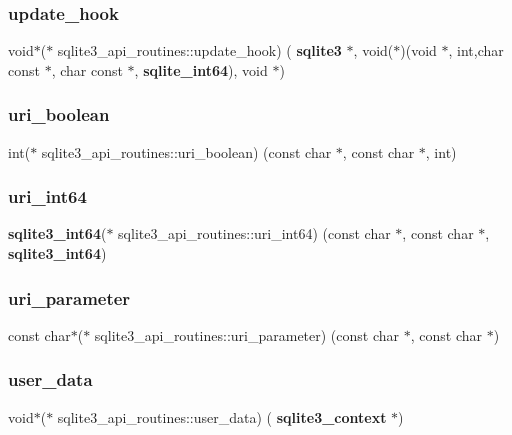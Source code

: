 \subsubsection{update\_hook}
{\footnotesize\ttfamily void$\ast$($\ast$ sqlite3\+\_\+api\+\_\+routines\+::update\+\_\+hook) (\textbf{ sqlite3} $\ast$, void($\ast$)(void $\ast$, int,char const  $\ast$, char const  $\ast$, \textbf{ sqlite\+\_\+int64}), void $\ast$)}

\mbox{\label{structsqlite3__api__routines_ac0aebc3fb86e2537e04be6db52d4a395}} 
\subsubsection{uri\_boolean}
{\footnotesize\ttfamily int($\ast$ sqlite3\+\_\+api\+\_\+routines\+::uri\+\_\+boolean) (const char $\ast$, const char $\ast$, int)}

\mbox{\label{structsqlite3__api__routines_a70dfce68b81e6c77b3e6c3d8e874c070}} 
\subsubsection{uri\_int64}
{\footnotesize\ttfamily \textbf{ sqlite3\+\_\+int64}($\ast$ sqlite3\+\_\+api\+\_\+routines\+::uri\+\_\+int64) (const char $\ast$, const char $\ast$, \textbf{ sqlite3\+\_\+int64})}

\mbox{\label{structsqlite3__api__routines_add5f520297676876e836eec5c976c6ba}} 
\subsubsection{uri\_parameter}
{\footnotesize\ttfamily const char$\ast$($\ast$ sqlite3\+\_\+api\+\_\+routines\+::uri\+\_\+parameter) (const char $\ast$, const char $\ast$)}

\mbox{\label{structsqlite3__api__routines_a4e066cc9b45c788202731ab113711833}} 
\subsubsection{user\_data}
{\footnotesize\ttfamily void$\ast$($\ast$ sqlite3\+\_\+api\+\_\+routines\+::user\+\_\+data) (\textbf{ sqlite3\+\_\+context} $\ast$)}

